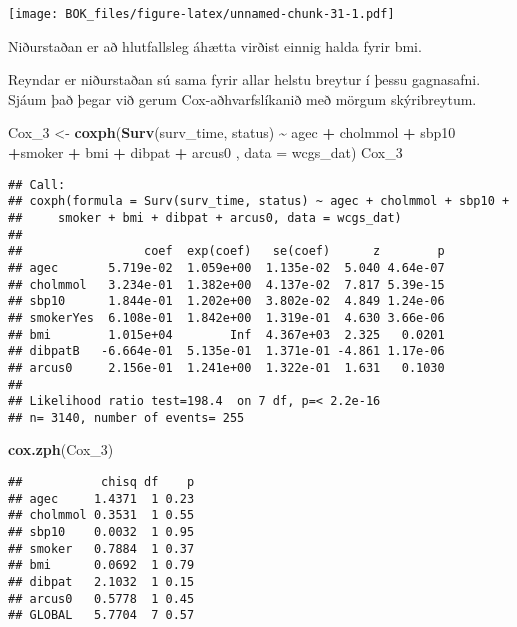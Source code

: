 \documentclass[
]{book}
\newenvironment{Shaded}{\begin{snugshade}}{\end{snugshade}}
\newcommand{\DataTypeTok}[1]{\textcolor[rgb]{0.13,0.29,0.53}{#1}}
\newcommand{\DecValTok}[1]{\textcolor[rgb]{0.00,0.00,0.81}{#1}}
\newcommand{\KeywordTok}[1]{\textcolor[rgb]{0.13,0.29,0.53}{\textbf{#1}}}
\newcommand{\NormalTok}[1]{#1}
\newcommand{\OperatorTok}[1]{\textcolor[rgb]{0.81,0.36,0.00}{\textbf{#1}}}
\newcommand{\StringTok}[1]{\textcolor[rgb]{0.31,0.60,0.02}{#1}}
\begin{document}
\texttt{[image: BOK\_files/figure-latex/unnamed-chunk-31-1.pdf]}

Niðurstaðan er að hlutfallsleg áhætta virðist einnig halda fyrir bmi.

Reyndar er niðurstaðan sú sama fyrir allar helstu breytur í þessu gagnasafni. Sjáum það þegar við gerum Cox-aðhvarfslíkanið með mörgum skýribreytum.

\begin{Shaded}
\begin{Highlighting}[]
\NormalTok{Cox\_}\DecValTok{3}\NormalTok{ <{-}}\StringTok{ }\KeywordTok{coxph}\NormalTok{(}\KeywordTok{Surv}\NormalTok{(surv\_time, status) }\OperatorTok{\textasciitilde{}}\StringTok{  }\NormalTok{agec }\OperatorTok{+}\StringTok{ }\NormalTok{cholmmol }\OperatorTok{+}\StringTok{ }\NormalTok{sbp10 }\OperatorTok{+}\NormalTok{smoker }\OperatorTok{+}\StringTok{ }\NormalTok{bmi  }\OperatorTok{+}\StringTok{ }\NormalTok{dibpat }\OperatorTok{+}\StringTok{ }\NormalTok{arcus0  , }\DataTypeTok{data =}\NormalTok{ wcgs\_dat)}
\NormalTok{Cox\_}\DecValTok{3}
\end{Highlighting}
\end{Shaded}

\begin{verbatim}
## Call:
## coxph(formula = Surv(surv_time, status) ~ agec + cholmmol + sbp10 + 
##     smoker + bmi + dibpat + arcus0, data = wcgs_dat)
## 
##                 coef  exp(coef)   se(coef)      z        p
## agec       5.719e-02  1.059e+00  1.135e-02  5.040 4.64e-07
## cholmmol   3.234e-01  1.382e+00  4.137e-02  7.817 5.39e-15
## sbp10      1.844e-01  1.202e+00  3.802e-02  4.849 1.24e-06
## smokerYes  6.108e-01  1.842e+00  1.319e-01  4.630 3.66e-06
## bmi        1.015e+04        Inf  4.367e+03  2.325   0.0201
## dibpatB   -6.664e-01  5.135e-01  1.371e-01 -4.861 1.17e-06
## arcus0     2.156e-01  1.241e+00  1.322e-01  1.631   0.1030
## 
## Likelihood ratio test=198.4  on 7 df, p=< 2.2e-16
## n= 3140, number of events= 255
\end{verbatim}

\begin{Shaded}
\begin{Highlighting}[]
\KeywordTok{cox.zph}\NormalTok{(Cox\_}\DecValTok{3}\NormalTok{)}
\end{Highlighting}
\end{Shaded}

\begin{verbatim}
##           chisq df    p
## agec     1.4371  1 0.23
## cholmmol 0.3531  1 0.55
## sbp10    0.0032  1 0.95
## smoker   0.7884  1 0.37
## bmi      0.0692  1 0.79
## dibpat   2.1032  1 0.15
## arcus0   0.5778  1 0.45
## GLOBAL   5.7704  7 0.57
\end{verbatim}
\end{document}
